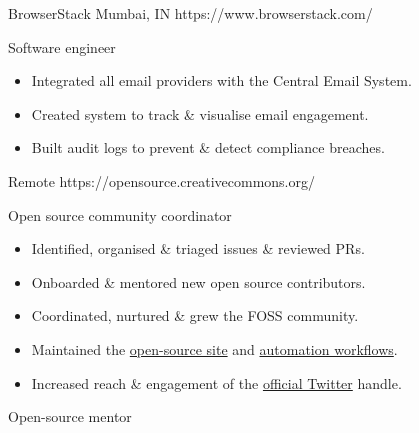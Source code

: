 

\organisationsubsection
  {BrowserStack}
  {Mumbai, IN}
  {https://www.browserstack.com/}

\rolesubsubsection
  {Software engineer}
  {}

\begin{sectiondescription}
  \begin{itemize}[nosep, leftmargin = *]
    \item Integrated all email providers with the Central Email System.
    \item Created system to track \& visualise email engagement.
    \item Built audit logs to prevent \& detect compliance breaches.
  \end{itemize}
\end{sectiondescription}


  {Remote}
  {https://opensource.creativecommons.org/}

\rolesubsubsection
  {Open source community coordinator}
  {}

\begin{sectiondescription}
  \begin{itemize}[nosep, leftmargin = *]
    \item Identified, organised \& triaged issues \& reviewed PRs.
    \item Onboarded \& mentored new open source contributors.
    \item Coordinated, nurtured \& grew the FOSS community.
    \item Maintained the \href{https://github.com/creativecommons/creativecommons.github.io-source/}{open-source site} and \href{https://github.com/creativecommons/ccos-scripts/}{automation workflows}.
    \item Increased reach \& engagement of the \href{https://twitter.com/cc_opensource}{official Twitter} handle.
  \end{itemize}
\end{sectiondescription}

\rolesubsubsection
  {Open-source mentor}
  {}

